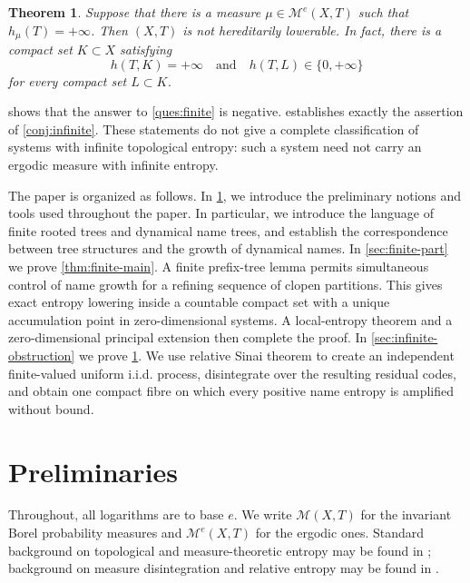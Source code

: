 \documentclass[10pt,a4paper]{amsart}
\newtheorem{theorem}{Theorem}[section]
\numberwithin{equation}{section}
\begin{document}
	\begin{theorem}
		\label{thm:infinite-main}
		Suppose that there is a measure $\mu\in \mathcal{M}^e(X,T)$ such that
		$h_\mu(T)=+\infty$. Then $(X,T)$ is not hereditarily lowerable. In fact, there
		is a compact set $K\subset X$ satisfying
		\[
		h(T,K)=+\infty
		\quad\text{and}\quad
		h(T,L)\in\{0,+\infty\}
		\]
		for every compact set $L\subset K$.
	\end{theorem}

	
	 shows that the answer to \cref{ques:finite} is negative.
	 establishes exactly the assertion of
	\cref{conj:infinite}. These statements do not give a complete classification
	of systems with infinite topological entropy: such a system need not carry an
	ergodic measure with infinite entropy.
	
	The paper is organized as follows. 
	In \cref{sec:preliminaries}, we introduce the preliminary notions and tools used throughout the paper. In particular, we introduce the language of finite rooted trees and dynamical name trees, and establish the correspondence between tree structures and the growth of dynamical names. 
	In \cref{sec:finite-part} we prove
	\cref{thm:finite-main}. A finite prefix-tree lemma permits simultaneous control
	of name growth for a refining sequence of clopen partitions. This gives exact
	entropy lowering inside a countable compact set with a unique accumulation
	point in zero-dimensional systems. A local-entropy theorem and a zero-dimensional principal extension then
	complete the proof. In \cref{sec:infinite-obstruction} we prove \cref{thm:infinite-main}. We use 
	relative Sinai theorem to create an independent finite-valued uniform i.i.d. process, disintegrate
	over the resulting residual codes, and obtain one compact fibre on which every
	positive name entropy is amplified without bound.
	
	\section{Preliminaries}
	\label{sec:preliminaries}
	
	Throughout, all logarithms are to base $e$. We write $\mathcal{M}(X,T)$ for the invariant Borel
	probability measures and $\mathcal{M}^e(X,T)$ for the ergodic ones. Standard background
	on topological and measure-theoretic entropy may be found in
	\cite{Walters1982,Downarowicz2011}; background on measure disintegration and relative
	entropy may be found in \cite{Glasner2003,EinsiedlerWard2011}.
	
\end{document}
